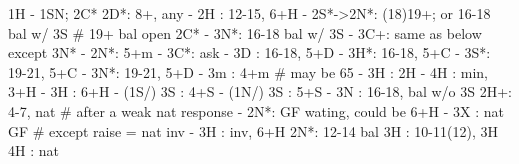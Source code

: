 1H - 1SN; 2C*
2D*: 8+, any
   - 2H : 12-15, 6+H
   - 2S*->2N*: (18)19+; or 16-18 bal w/ 3S  # 19+ bal open 2C*
             - 3N*: 16-18 bal w/ 3S
             - 3C+: same as below except 3N*
   - 2N*: 5+m
        - 3C*: ask
            - 3D : 16-18, 5+D
            - 3H*: 16-18, 5+C
            - 3S*: 19-21, 5+C
            - 3N*: 19-21, 5+D
   - 3m : 4+m  # may be 65
        - 3H : 2H
        - 4H : min, 3+H
   - 3H : 6+H
   - (1S/) 3S : 4+S
   - (1N/) 3S : 5+S
   - 3N : 16-18, bal w/o 3S
2H+: 4-7, nat
# after a weak nat response
   - 2N*: GF wating, could be 6+H
   - 3X : nat GF  # except raise = nat inv
   - 3H : inv, 6+H
2N*: 12-14 bal
3H : 10-11(12), 3H
4H : nat